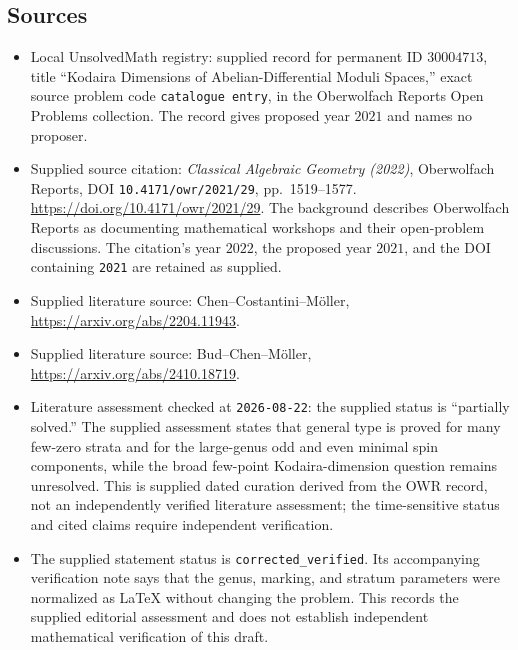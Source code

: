 \documentclass[11pt]{article}
\begin{document}
\subsection{Sources}
\begin{itemize}
\item Local UnsolvedMath registry: supplied record for permanent ID \(30004713\), title ``Kodaira Dimensions of Abelian-Differential Moduli Spaces,'' exact source problem code \texttt{catalogue entry}, in the Oberwolfach Reports Open Problems collection. The record gives proposed year \(2021\) and names no proposer.
\item Supplied source citation: \emph{Classical Algebraic Geometry (2022)}, Oberwolfach Reports, DOI \texttt{10.4171/owr/2021/29}, pp.\ 1519--1577. \url{https://doi.org/10.4171/owr/2021/29}. The background describes Oberwolfach Reports as documenting mathematical workshops and their open-problem discussions. The citation's year \(2022\), the proposed year \(2021\), and the DOI containing \texttt{2021} are retained as supplied.
\item Supplied literature source: Chen--Costantini--Möller, \url{https://arxiv.org/abs/2204.11943}.
\item Supplied literature source: Bud--Chen--Möller, \url{https://arxiv.org/abs/2410.18719}.
\item Literature assessment checked at \texttt{2026-08-22}: the supplied status is ``partially solved.'' The supplied assessment states that general type is proved for many few-zero strata and for the large-genus odd and even minimal spin components, while the broad few-point Kodaira-dimension question remains unresolved. This is supplied dated curation derived from the OWR record, not an independently verified literature assessment; the time-sensitive status and cited claims require independent verification.
\item The supplied statement status is \texttt{corrected\_verified}. Its accompanying verification note says that the genus, marking, and stratum parameters were normalized as LaTeX without changing the problem. This records the supplied editorial assessment and does not establish independent mathematical verification of this draft.
\end{itemize}
\end{document}
